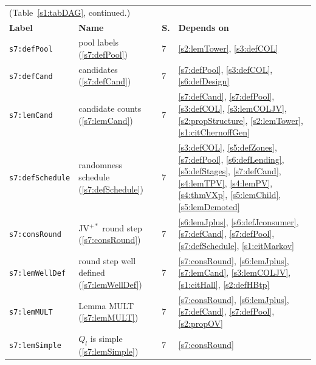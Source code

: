 \begin{center}
{\footnotesize
\setlength{\tabcolsep}{3pt}
\begin{tabular}{p{3.2cm}p{3.6cm}p{0.5cm}p{7.6cm}}
\multicolumn{4}{l}{(Table~\ref{s1:tabDAG}, continued.)}\\
\textbf{Label} & \textbf{Name} & \textbf{S.} & \textbf{Depends on}\\
\hline
\texttt{s7:defPool} & pool labels (\ref{s7:defPool}) & 7 & \ref{s2:lemTower}, \ref{s3:defCOL}\\
\texttt{s7:defCand} & candidates (\ref{s7:defCand}) & 7 & \ref{s7:defPool}, \ref{s3:defCOL}, \ref{s6:defDesign}\\
\texttt{s7:lemCand} & candidate counts (\ref{s7:lemCand}) & 7 & \ref{s7:defCand}, \ref{s7:defPool}, \ref{s3:defCOL}, \ref{s3:lemCOLJV}, \ref{s2:propStructure}, \ref{s2:lemTower}, \ref{s1:citChernoffGen}\\
\texttt{s7:defSchedule} & randomness schedule (\ref{s7:defSchedule}) & 7 & \ref{s3:defCOL}, \ref{s5:defZones}, \ref{s7:defPool}, \ref{s6:defLending}, \ref{s5:defStages}, \ref{s7:defCand}, \ref{s4:lemTPV}, \ref{s4:lemPV}, \ref{s4:thmVXp}, \ref{s5:lemChild}, \ref{s5:lemDemoted}\\
\texttt{s7:consRound} & JV$^{+*}$ round step (\ref{s7:consRound}) & 7 & \ref{s6:lemJplus}, \ref{s6:defJconsumer}, \ref{s7:defCand}, \ref{s7:defPool}, \ref{s7:defSchedule}, \ref{s1:citMarkov}\\
\texttt{s7:lemWellDef} & round step well defined (\ref{s7:lemWellDef}) & 7 & \ref{s7:consRound}, \ref{s6:lemJplus}, \ref{s7:lemCand}, \ref{s3:lemCOLJV}, \ref{s1:citHall}, \ref{s2:defHBtp}\\
\texttt{s7:lemMULT} & Lemma MULT (\ref{s7:lemMULT}) & 7 & \ref{s7:consRound}, \ref{s6:lemJplus}, \ref{s7:defCand}, \ref{s7:defPool}, \ref{s2:propOV}\\
\texttt{s7:lemSimple} & $Q_l$ is simple (\ref{s7:lemSimple}) & 7 & \ref{s7:consRound}\\
\hline
\end{tabular}}
\end{center}

